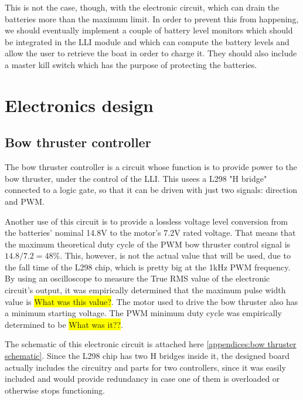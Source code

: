 This is not the case, though, with the electronic circuit, which can drain the batteries more than the maximum limit. In order to prevent this from happening, we should eventually implement a couple of battery level monitors which should be integrated in the \ac{LLI} module and which can compute the battery levels and allow the user to retrieve the boat in order to charge it. They should also include a master kill switch which has the purpose of protecting the batteries.

\section{Electronics design}

\subsection{Bow thruster controller}
\label{subsec:bow thruster controller}

The bow thruster controller is a circuit whose function is to provide power to the bow thruster, under the control of the \ac{LLI}. This usees a L298 "H bridge" connected to a logic gate, so that it can be driven with just two signals: direction and \ac{PWM}.

Another use of this circuit is to provide a lossless voltage level conversion from the batteries' nominal 14.8V to the motor's 7.2V rated voltage. That means that the maximum theoretical duty cycle of the PWM bow thruster control signal is $ 14.8 / 7.2 = 48 \% $. This, however, is not the actual value that will be used, due to the fall time of the L298 chip, which is pretty big at the 1kHz PWM frequency. By using an oscilloscope to measure the True RMS value of the electronic circuit's output, it was empirically determined that the maximum pulse width value is \colorbox{yellow}{What was this value?}. 
The motor used to drive the bow thruster also has a minimum starting voltage. The PWM minimum duty cycle was empirically determined to be \colorbox{yellow}{What was it??}.

The schematic of this electronic circuit is attached here \ref{appendices:bow thruster schematic}. Since the L298 chip has two H bridges inside it, the designed board actually includes the circuitry and parts for two controllers, since it was easily included and would provide redundancy in case one of them is overloaded or otherwise stops functioning.
